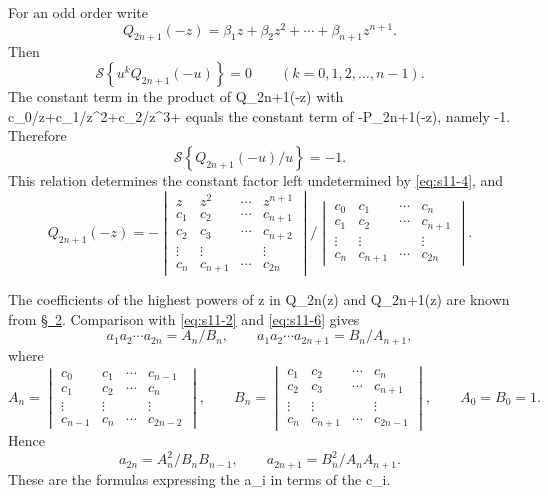 \documentclass[
  paper=b5,
  fontsize=13pt,
  twoside,
  headings=normal,
  bookmarkpackage=false
]{scrartcl}
\theoremstyle{stieltjesplain}
\theoremstyle{stieltjesdefinition}
\def\({}\def\){}%
\def\frac#1#2{#1/#2}%
\begin{document}
For an odd order write
\[
 Q_{2n+1}(-z)=\beta_1z+\beta_2z^2+\cdots+\beta_{n+1}z^{n+1}.
\]
Then
\begin{equation}
 \mathcal S\!\left\{u^kQ_{2n+1}(-u)\right\}=0
 \qquad(k=0,1,2,\ldots,n-1).
 \tag{4}\label{eq:s11-4}
\end{equation}
The constant term in the product of \(Q_{2n+1}(-z)\) with
\(c_0/z+c_1/z^2+c_2/z^3+\cdots\) equals the constant term of
\(-P_{2n+1}(-z)\), namely \(-1\). Therefore
\begin{equation}
 \mathcal S\!\left\{\frac{Q_{2n+1}(-u)}u\right\}=-1.
 \tag{5}\label{eq:s11-5}
\end{equation}
This relation determines the constant factor left undetermined by
\eqref{eq:s11-4}, and
\begin{equation}
 Q_{2n+1}(-z)=
 -\frac{
 \begin{vmatrix}
  z&z^2&\cdots&z^{n+1}\\
  c_1&c_2&\cdots&c_{n+1}\\
  c_2&c_3&\cdots&c_{n+2}\\
  \vdots&\vdots&&\vdots\\
  c_n&c_{n+1}&\cdots&c_{2n}
 \end{vmatrix}}
 {\begin{vmatrix}
  c_0&c_1&\cdots&c_n\\
  c_1&c_2&\cdots&c_{n+1}\\
  \vdots&\vdots&&\vdots\\
  c_n&c_{n+1}&\cdots&c_{2n}
 \end{vmatrix}}.
 \tag{6}\label{eq:s11-6}
\end{equation}

The coefficients of the highest powers of \(z\) in \(Q_{2n}(z)\) and
\(Q_{2n+1}(z)\) are known from \hyperref[sec:2]{\S~2}. Comparison with
\eqref{eq:s11-2} and \eqref{eq:s11-6} gives
\[
 a_1a_2\cdots a_{2n}=\frac{A_n}{B_n},
 \qquad
 a_1a_2\cdots a_{2n+1}=\frac{B_n}{A_{n+1}},
\]
where
\[
 A_n=\begin{vmatrix}
 c_0&c_1&\cdots&c_{n-1}\\
 c_1&c_2&\cdots&c_n\\
 \vdots&\vdots&&\vdots\\
 c_{n-1}&c_n&\cdots&c_{2n-2}
 \end{vmatrix},\qquad
 B_n=\begin{vmatrix}
 c_1&c_2&\cdots&c_n\\
 c_2&c_3&\cdots&c_{n+1}\\
 \vdots&\vdots&&\vdots\\
 c_n&c_{n+1}&\cdots&c_{2n-1}
 \end{vmatrix},
 \qquad A_0=B_0=1.
\]
Hence
\begin{equation}
 a_{2n}=\frac{A_n^2}{B_nB_{n-1}},
 \qquad
 a_{2n+1}=\frac{B_n^2}{A_nA_{n+1}}.
 \tag{7}\label{eq:s11-7}
\end{equation}
These are the formulas expressing the \(a_i\) in terms of the \(c_i\).
\end{document}
